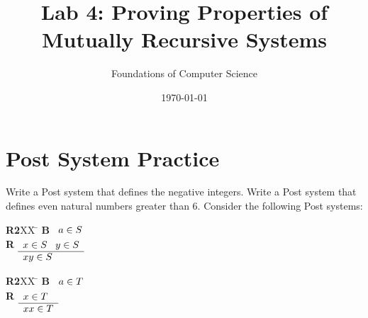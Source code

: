 \documentclass[]{exam}
\title{Lab 4: Proving Properties of Mutually Recursive Systems}
\author{Foundations of Computer Science}
\date{\today}
\theoremstyle{definition}
\begin{document}
\maketitle

\setlength{\columnseprule}{1pt}
\section*{Post System Practice}
\begin{questions}
\question Write a Post system that defines the negative integers.
\question Write a Post system that defines even natural numbers greater than $6$.
\question Consider the following Post systems:
\begin{multicols}{2}
\begin{tabbing}
{\bf R2}XX \=  \kill
{\bf B} \>
        \(\begin{array}[t]{l}
        a \in S
        \end{array}\) \\[2ex]
{\bf R} \>
        \(\begin{array}[t]{l}
        x \in S \;\;\;y \in S \\
        \hline
        xy \in S
        \end{array}\)
\end{tabbing}

\begin{tabbing}
{\bf R2}XX \=  \kill
{\bf B} \>
        \(\begin{array}[t]{l}
        a \in T
        \end{array}\) \\[2ex]
{\bf R} \>
        \(\begin{array}[t]{l}
        x \in T \\
        \hline
        xx \in T
        \end{array}\)
\end{tabbing}

\end{multicols}


\end{questions}
\end{document}
